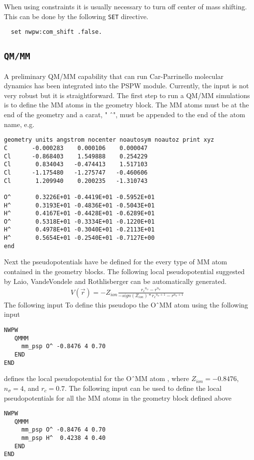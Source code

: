 When using constraints it is usually necessary to turn off
center of mass shifting. This can be done by the following \verb+SET+ directive.
\begin{verbatim}
  set nwpw:com_shift .false.
\end{verbatim}

\subsection{\tt QM/MM}
\label{sec:pspw_qmmm}
A preliminary QM/MM capability that can run Car-Parrinello molecular dynamics  has been integrated 
into the PSPW module.  Currently, the input is  not very robust but it is straightforward.  The first 
step to run a QM/MM simulations is to define the MM atoms in the geometry block.  The MM atoms must be
at the end of the geometry and a carat, " \^\ ", must be appended to the end of the atom name, e.g.
\begin{verbatim}
geometry units angstrom nocenter noautosym noautoz print xyz
C       -0.000283    0.000106    0.000047
Cl      -0.868403    1.549888    0.254229
Cl       0.834043   -0.474413    1.517103
Cl      -1.175480   -1.275747   -0.460606
Cl       1.209940    0.200235   -1.310743

O^       0.3226E+01 -0.4419E+01 -0.5952E+01 
H^       0.3193E+01 -0.4836E+01 -0.5043E+01 
H^       0.4167E+01 -0.4428E+01 -0.6289E+01
O^       0.5318E+01 -0.3334E+01 -0.1220E+01
H^       0.4978E+01 -0.3040E+01 -0.2113E+01
H^       0.5654E+01 -0.2540E+01 -0.7127E+00
end
\end{verbatim}
Next the pseudopotentials have be defined for the every type of MM atom contained in the geometry blocks.  The
following local pseudopotential suggested by Laio, VandeVondele and Rothlisberger can be automatically generated.
\begin{eqnarray}
V(\vec{r}) = -Z_{ion}\frac{{r_c}^{n_{\sigma}} - r^{n_{\sigma}}}{-sign(Z_{ion})*{r_c}^{n_{\sigma}+1}-r^{n_{\sigma}+1}}
\end{eqnarray}
The following input To define this pseudopo the O\^\ MM atom using the following input
\begin{verbatim}
NWPW
   QMMM
     mm_psp O^ -0.8476 4 0.70
   END
END
\end{verbatim}
defines the local pseudopotential for the O\^\  MM atom , where $Z_{ion}=-0.8476$, $n_{\sigma}=4$, and $r_c=0.7$.  
The following input can be used to define the local pseudopotentials for all the MM atoms in the geometry
block defined above
\begin{verbatim}
NWPW
   QMMM
     mm_psp O^ -0.8476 4 0.70
     mm_psp H^  0.4238 4 0.40
   END
END
\end{verbatim}
